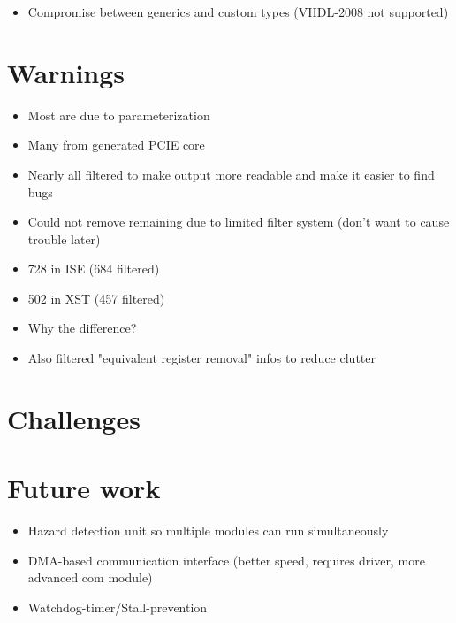 \TODO

\begin{itemize}
    \item Compromise between generics and custom types (VHDL-2008 not supported)
\end{itemize}

\section{Warnings}

\begin{itemize}
    \item Most are due to parameterization
    \item Many from generated PCIE core
    \item Nearly all filtered to make output more readable and make it easier to find bugs
    \item Could not remove remaining due to limited filter system (don't want to cause trouble later)
    \item 728 in ISE (684 filtered)
    \item 502 in XST (457 filtered)
    \item Why the difference?
    \item Also filtered "equivalent register removal" infos to reduce clutter
\end{itemize}

\section{Challenges}
\label{sec:challenges}

\TODO

\section{Future work}

\begin{itemize}
    \item Hazard detection unit so multiple modules can run simultaneously
    \item DMA-based communication interface (better speed, requires driver, more advanced com module)
    \item Watchdog-timer/Stall-prevention
\end{itemize}
